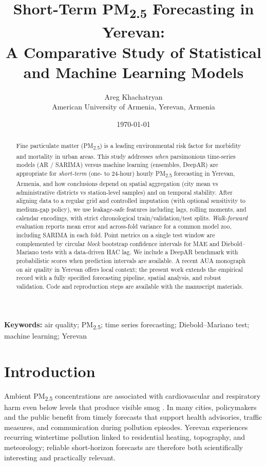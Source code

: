 \documentclass[11pt,a4paper]{article}
\title{Short-Term PM\textsubscript{2.5} Forecasting in Yerevan:\\
A Comparative Study of Statistical and Machine Learning Models}
\author{%
Areg Khachatryan\\[0.5em]
\small American University of Armenia, Yerevan, Armenia}
\date{\today}
\begin{document}
\maketitle

\begin{abstract}
Fine particulate matter (PM\textsubscript{2.5}) is a leading environmental risk factor for morbidity and mortality in urban areas. This study addresses \emph{when} parsimonious time-series models (AR / SARIMA) versus machine learning (ensembles, DeepAR) are appropriate for \emph{short-term} (one- to 24-hour) hourly PM\textsubscript{2.5} forecasting in Yerevan, Armenia, and how conclusions depend on spatial aggregation (city mean vs administrative districts vs station-level samples) and on temporal stability. After aligning data to a regular grid and controlled imputation (with optional sensitivity to medium-gap policy), we use leakage-safe features including lags, rolling moments, and calendar encodings, with strict chronological train/validation/test splits. \emph{Walk-forward} evaluation reports mean error and across-fold variance for a common model zoo, including SARIMA in each fold. Point metrics on a single test window are complemented by circular \emph{block} bootstrap confidence intervals for MAE and Diebold--Mariano tests with a data-driven HAC lag. We include a DeepAR benchmark with probabilistic scores when prediction intervals are available. A recent AUA monograph on air quality in Yerevan \citep{auaair2025yerevan} offers local context; the present work extends the empirical record with a fully specified forecasting pipeline, spatial analysis, and robust validation. Code and reproduction steps are available with the manuscript materials.
\end{abstract}

\noindent\textbf{Keywords:} air quality; PM\textsubscript{2.5}; time series forecasting; Diebold--Mariano test; machine learning; Yerevan

\section{Introduction}

Ambient PM\textsubscript{2.5} concentrations are associated with cardiovascular and respiratory harm even below levels that produce visible smog \citep{world2021who}. In many cities, policymakers and the public benefit from timely forecasts that support health advisories, traffic measures, and communication during pollution episodes. Yerevan experiences recurring wintertime pollution linked to residential heating, topography, and meteorology; reliable short-horizon forecasts are therefore both scientifically interesting and practically relevant.
\end{document}

